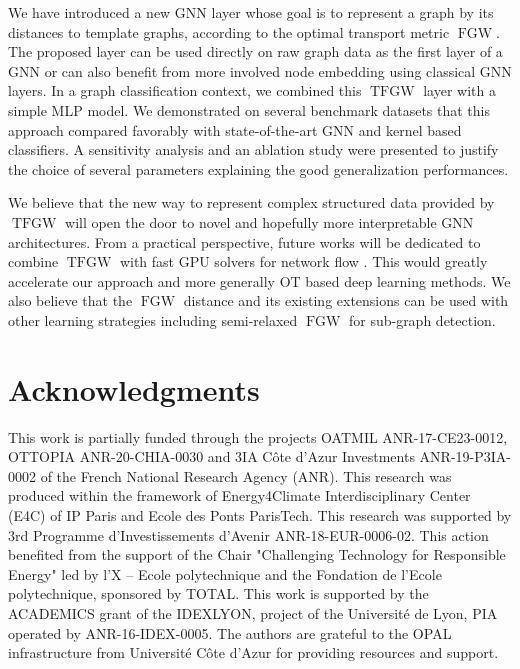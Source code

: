 \documentclass{article}
\newcommand{\FGW}{\operatorname{FGW}}
\newcommand{\TFGW}{\operatorname{TFGW}}
\begin{document}
{We have introduced a new GNN layer whose goal is to represent a graph by its distances to template graphs, according to the optimal transport metric $\FGW$. The proposed layer can be used directly on raw graph data as the first layer of a GNN or can also
benefit from more involved node embedding using classical GNN layers. In a graph classification context, we combined this $\TFGW$ layer with a simple MLP model. We demonstrated on several benchmark datasets that this approach compared favorably with
state-of-the-art GNN and kernel based classifiers. A sensitivity analysis and an ablation study were presented to justify the
choice of several parameters explaining the good generalization performances.  

We believe that the new
way to represent complex structured data provided by $\TFGW$ will open the door to novel and
hopefully more interpretable GNN architectures. From a practical perspective, future works will be dedicated to combine $\TFGW$ with fast GPU solvers for network flow \cite{shekhovtsov2013distributed}. This would greatly accelerate our approach and more generally OT based deep learning methods. We also believe that the $\FGW$ distance and its existing extensions can be used with other learning
strategies including semi-relaxed $\FGW$ \cite{vincent-cuaz2022semirelaxed} for sub-graph detection.

%
 	\label{sec:conclusion}
	
\section*{Acknowledgments}
This work is partially funded through the projects OATMIL ANR-17-CE23-0012, OTTOPIA ANR-20-CHIA-0030 
and 3IA C\^{o}te d'Azur Investments ANR-19-P3IA-0002 of the French National Research
Agency (ANR). This research was produced within the framework of Energy4Climate
Interdisciplinary Center (E4C) of IP Paris and Ecole des Ponts ParisTech. This
research was supported by 3rd Programme d'Investissements d'Avenir
ANR-18-EUR-0006-02. This action benefited from the support of the Chair
"Challenging Technology for Responsible Energy" led by l'X – Ecole polytechnique
and the Fondation de l'Ecole polytechnique, sponsored by TOTAL. This work is supported by the ACADEMICS grant of the IDEXLYON, project of the Université de Lyon, PIA operated by ANR-16-IDEX-0005.
The authors are grateful to the OPAL infrastructure from Universit\'{e} C\^{o}te d'Azur for providing resources and support.

	
	


}
\end{document}
